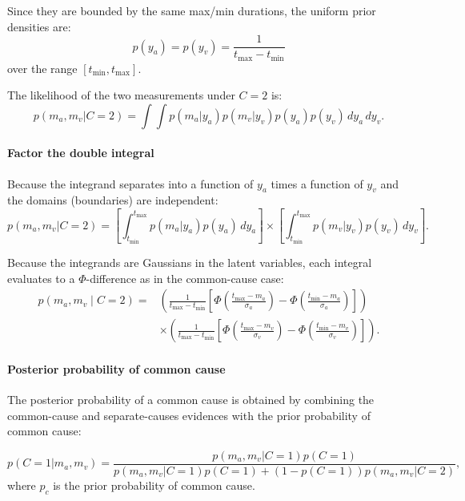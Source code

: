 \documentclass{jov}
\begin{document}
Since they are bounded by the same max/min durations, the uniform prior densities are:
\begin{equation}
p(y_a) = p(y_v) = \frac{1}{t_{\max} - t_{\min}}
\end{equation}
over the range $[t_{\min}, t_{\max}]$.

The likelihood of the two measurements under $C=2$ is:
\begin{equation}
p(m_a, m_v | C=2) = \int \int p(m_a | y_a) p(m_v | y_v) p(y_a) p(y_v) \, dy_a \, dy_v.
\end{equation}


\paragraph{Factor the double integral}

Because the integrand separates into a function of $y_a$ times a function of $y_v$ and the domains (boundaries) are independent:
\begin{equation}
p(m_a, m_v | C=2) = \left[\int_{t_{\min}}^{t_{\max}} p(m_a | y_a) p(y_a) \, dy_a\right] 
\times \left[\int_{t_{\min}}^{t_{\max}} p(m_v | y_v) p(y_v) \, dy_v\right].
\end{equation}

Because the integrands are Gaussians in the latent variables, each integral evaluates to a $\Phi$-difference as in the common-cause case:
\begin{align}
\label{eq:likelihood_c2_final}
p(m_a, m_v \mid C\!=\!2)
= &\left(\frac{1}{t_{\max} - t_{\min}} \left[\Phi\!\left(\frac{t_{\max} - m_a}{\sigma_a}\right) - \Phi\!\left(\frac{t_{\min} - m_a}{\sigma_a}\right)\right]\right) \\
 &\times \left(\frac{1}{t_{\max} - t_{\min}} \left[\Phi\!\left(\frac{t_{\max} - m_v}{\sigma_v}\right) - \Phi\!\left(\frac{t_{\min} - m_v}{\sigma_v}\right)\right]\right).
\end{align}

\paragraph{Posterior probability of common cause}

The posterior probability of a common cause is obtained by combining the common-cause and separate-causes evidences with the prior probability of common cause:

\begin{equation}
p(C=1 | m_a, m_v) = \frac{p(m_a, m_v | C=1) p(C=1)}{p(m_a, m_v | C=1) p(C=1) + (1 - p(C=1)) p(m_a, m_v | C=2)},
\end{equation}
where $p_c$ is the prior probability of common cause.
\end{document}
